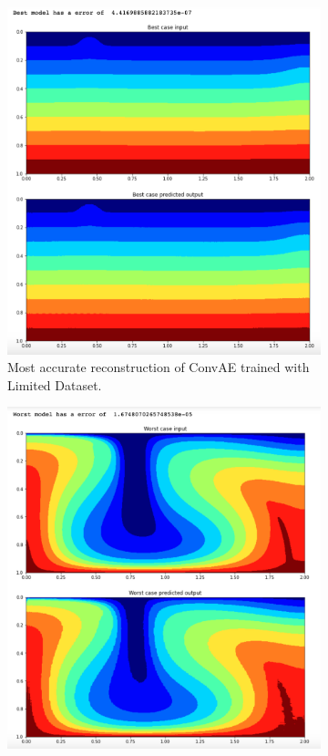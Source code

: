 \begin{figure}[H]
\centering
\begin{subfigure}{0.45\textwidth}
    \includegraphics[width=\textwidth]{figures/mantle_convection_images/limited_dataset/ConvAE_Best.png}
    \caption{Most accurate reconstruction of ConvAE trained with Limited Dataset.}
\end{subfigure}
\hfill
\begin{subfigure}{0.45\textwidth}
    \includegraphics[width=\textwidth]{figures/mantle_convection_images/limited_dataset/ConvAE_Worst.png}

\end{subfigure}
\end{figure}
